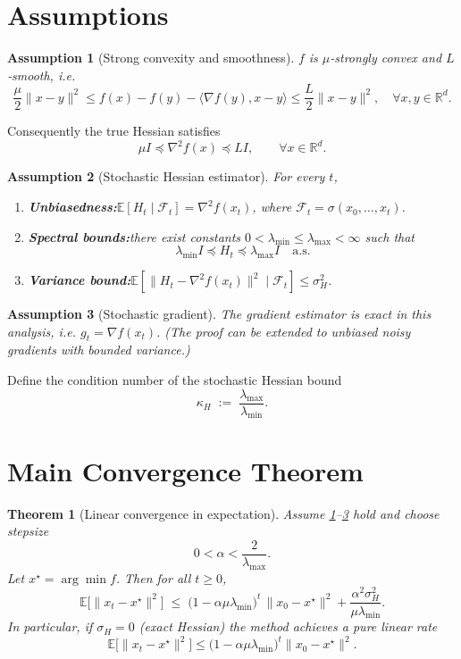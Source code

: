 \documentclass{article}
\newtheorem{theorem}{Theorem}
\newtheorem{assumption}{Assumption}
\newcommand{\E}{\mathbb{E}}
\newcommand{\R}{\mathbb{R}}
\begin{document}
\newpage
\section*{Assumptions}
\begin{assumption}[Strong convexity and smoothness]\label{assump:sc}
$f$ is $\mu$‑strongly convex and $L$‑smooth, i.e.
\[
\frac{\mu}{2}\|x-y\|^{2}\le f(x)-f(y)-\langle\nabla f(y),x-y\rangle\le \frac{L}{2}\|x-y\|^{2},
\quad\forall x,y\in\R^{d}.
\tag{2}
\]
\end{assumption}
Consequently the true Hessian satisfies
\[
\mu I\preceq \nabla^{2}f(x)\preceq L I,\qquad\forall x\in\R^{d}.
\tag{3}
\]

\begin{assumption}[Stochastic Hessian estimator]\label{assump:hess}
For every $t$,
\begin{enumerate}
\item \textbf{Unbiasedness:}\quad $\E[H_{t}\mid\mathcal{F}_{t}]=\nabla^{2}f(x_{t})$, where $\mathcal{F}_{t}=\sigma(x_{0},\dots,x_{t})$.
\item \textbf{Spectral bounds:}\quad there exist constants $0<\lambda_{\min}\le\lambda_{\max}<\infty$ such that
\[
\lambda_{\min} I\preceq H_{t}\preceq \lambda_{\max} I\quad\text{a.s.}
\tag{4}
\]
\item \textbf{Variance bound:}\quad $\E\!\left[\|H_{t}-\nabla^{2}f(x_{t})\|^{2}\mid\mathcal{F}_{t}\right]\le\sigma_{H}^{2}$.
\end{enumerate}
\end{assumption}

\begin{assumption}[Stochastic gradient]\label{assump:grad}
The gradient estimator is exact in this analysis, i.e. $g_{t}=\nabla f(x_{t})$.  (The proof can be extended to unbiased noisy gradients with bounded variance.)
\end{assumption}

Define the condition number of the stochastic Hessian bound
\[
\kappa_{H}\;:=\;\frac{\lambda_{\max}}{\lambda_{\min}}.
\tag{5}
\]

\section*{Main Convergence Theorem}
\begin{theorem}[Linear convergence in expectation]\label{thm:linear}
Assume \ref{assump:sc}–\ref{assump:grad} hold and choose stepsize 
\[
0<\alpha<\frac{2}{\lambda_{\max}}.
\tag{6}
\]
Let $x^{\star}=\arg\min f$.  Then for all $t\ge0$,
\[
\E\!\big[\|x_{t}-x^{\star}\|^{2}\big]\;\le\;\big(1-\alpha\mu\lambda_{\min}\big)^{t}\,\|x_{0}-x^{\star}\|^{2}
   +\frac{\alpha^{2}\sigma_{H}^{2}}{\mu\lambda_{\min}}.
\tag{7}
\]
In particular, if $\sigma_{H}=0$ (exact Hessian) the method achieves a pure linear rate
\[
\E\!\big[\|x_{t}-x^{\star}\|^{2}\big]\le\big(1-\alpha\mu\lambda_{\min}\big)^{t}\|x_{0}-x^{\star}\|^{2}.
\tag{8}
\]
\end{theorem}
\end{document}
